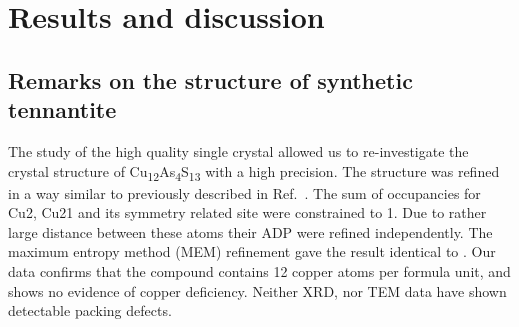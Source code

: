 \documentclass[preprint,review,12pt]{elsarticle}
\begin{document}
\section{Results and discussion}\label{sec:level1}

\subsection{Remarks on the structure of synthetic tennantite}\label{sec:level2}
The study of the high quality single crystal allowed us to re-investigate the crystal structure of Cu\textsubscript{12}As\textsubscript{4}S\textsubscript{13}  with a high precision.
The structure was refined in a way similar to previously described in Ref.~\cite{yaroslavzev2019}.
The sum of occupancies for Cu2, Cu21 and its symmetry related site were constrained to 1.
Due to rather large distance between these atoms their ADP were refined independently.
The maximum entropy method (MEM) refinement gave the result identical to \cite{yaroslavzev2019}.
Our data confirms that the compound contains 12 copper atoms per formula unit, and shows no evidence of copper deficiency.
Neither XRD, nor TEM data have shown detectable packing defects.

\begin{table}
\caption{\label{tab:anis_ext}%
Anisotropic extinction parameters in Cu\textsubscript{12}As\textsubscript{4}S\textsubscript{13}.
}
\centering
{}
\end{table}
\end{document}
